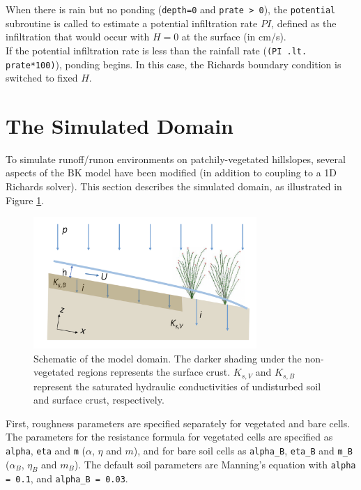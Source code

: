 \documentclass{article}
\newcommand{\code}[1]{\texttt{#1}}
\begin{document}
When there is rain but no ponding (\code{depth=0} and \code{prate > 0}), the  \code{potential} subroutine is called to estimate a potential infiltration rate $PI$, defined as the infiltration that would occur with $H=0$ at the surface (in cm/s). \\  
If the potential infiltration rate is less than the rainfall rate (\code{(PI .lt. prate*100)}), ponding begins.  In this case, the Richards boundary condition is switched to fixed $H$.


	
\section{The Simulated Domain}
\label{domain}
To simulate runoff/runon environments on patchily-vegetated hillslopes, several aspects of the BK model have been modified (in addition to coupling to a 1D Richards solver).  This section describes the simulated domain, as illustrated in Figure \ref{domain_schematic}.

 \begin{figure}[h]
 \centering
\includegraphics[width=20pc]{grid/domain_schematic.png}
 \caption{Schematic of the model domain.  The darker shading under the non-vegetated regions represents the surface crust.  $K_{s,V}$ and $K_{s,B}$  represent the saturated hydraulic conductivities of undisturbed soil and surface crust, respectively.}
 \label{domain_schematic}
 \end{figure}
 
 
First,  roughness parameters are specified separately for vegetated and bare cells. 
 The parameters for the resistance formula for vegetated cells are specified as  \code{alpha}, \code{eta} and \code{m}  ($\alpha$, $\eta$ and $m$), and for bare soil cells as  \code{alpha\_B}, \code{eta\_B} and \code{m\_B}  ($\alpha_B$, $\eta_B$ and $m_B$).
  The default soil parameters are Manning's equation with \code{alpha = 0.1}, and \code{alpha\_B = 0.03}.
\end{document}
